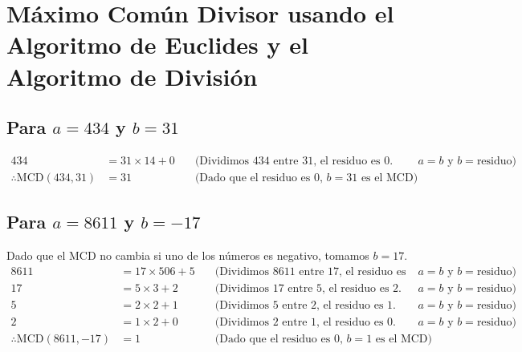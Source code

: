\documentclass{article}
\begin{document}
\section*{Máximo Común Divisor usando el Algoritmo de Euclides y el Algoritmo de División}

\subsection*{Para \(a = 434\) y \(b = 31\)}
\begin{align*}
434 & = 31 \times 14 + 0 &\quad \text{(Dividimos 434 entre 31, el residuo es 0. Según el algoritmo, hacemos } a = b \text{ y } b = \text{residuo)} \\
\therefore \text{MCD}(434,31) & = 31 &\quad \text{(Dado que el residuo es 0, } b = 31 \text{ es el MCD)}
\end{align*}

\subsection*{Para \(a = 8611\) y \(b = -17\)}
Dado que el MCD no cambia si uno de los números es negativo, tomamos \(b = 17\).
\begin{align*}
8611 & = 17 \times 506 + 5 &\quad \text{(Dividimos 8611 entre 17, el residuo es 5. Según el algoritmo, hacemos } a = b \text{ y } b = \text{residuo)} \\
17 & = 5 \times 3 + 2 &\quad \text{(Dividimos 17 entre 5, el residuo es 2. Según el algoritmo, hacemos } a = b \text{ y } b = \text{residuo)} \\
5 & = 2 \times 2 + 1 &\quad \text{(Dividimos 5 entre 2, el residuo es 1. Según el algoritmo, hacemos } a = b \text{ y } b = \text{residuo)} \\
2 & = 1 \times 2 + 0 &\quad \text{(Dividimos 2 entre 1, el residuo es 0. Según el algoritmo, hacemos } a = b \text{ y } b = \text{residuo)} \\
\therefore \text{MCD}(8611,-17) & = 1 &\quad \text{(Dado que el residuo es 0, } b = 1 \text{ es el MCD)}
\end{align*}
\end{document}
